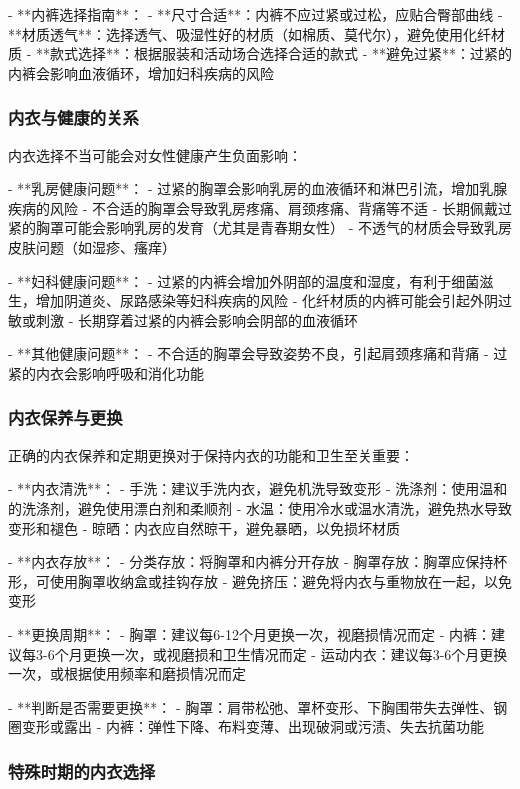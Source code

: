 \begin{enumerate}
- **内裤选择指南**：
  - **尺寸合适**：内裤不应过紧或过松，应贴合臀部曲线
  - **材质透气**：选择透气、吸湿性好的材质（如棉质、莫代尔），避免使用化纤材质
  - **款式选择**：根据服装和活动场合选择合适的款式
  - **避免过紧**：过紧的内裤会影响血液循环，增加妇科疾病的风险

\subsubsection{内衣与健康的关系}

内衣选择不当可能会对女性健康产生负面影响：

- **乳房健康问题**：
  - 过紧的胸罩会影响乳房的血液循环和淋巴引流，增加乳腺疾病的风险
  - 不合适的胸罩会导致乳房疼痛、肩颈疼痛、背痛等不适
  - 长期佩戴过紧的胸罩可能会影响乳房的发育（尤其是青春期女性）
  - 不透气的材质会导致乳房皮肤问题（如湿疹、瘙痒）

- **妇科健康问题**：
  - 过紧的内裤会增加外阴部的温度和湿度，有利于细菌滋生，增加阴道炎、尿路感染等妇科疾病的风险
  - 化纤材质的内裤可能会引起外阴过敏或刺激
  - 长期穿着过紧的内裤会影响会阴部的血液循环

- **其他健康问题**：
  - 不合适的胸罩会导致姿势不良，引起肩颈疼痛和背痛
  - 过紧的内衣会影响呼吸和消化功能

\subsubsection{内衣保养与更换}

正确的内衣保养和定期更换对于保持内衣的功能和卫生至关重要：

- **内衣清洗**：
  - 手洗：建议手洗内衣，避免机洗导致变形
  - 洗涤剂：使用温和的洗涤剂，避免使用漂白剂和柔顺剂
  - 水温：使用冷水或温水清洗，避免热水导致变形和褪色
  - 晾晒：内衣应自然晾干，避免暴晒，以免损坏材质

- **内衣存放**：
  - 分类存放：将胸罩和内裤分开存放
  - 胸罩存放：胸罩应保持杯形，可使用胸罩收纳盒或挂钩存放
  - 避免挤压：避免将内衣与重物放在一起，以免变形

- **更换周期**：
  - 胸罩：建议每6-12个月更换一次，视磨损情况而定
  - 内裤：建议每3-6个月更换一次，或视磨损和卫生情况而定
  - 运动内衣：建议每3-6个月更换一次，或根据使用频率和磨损情况而定

- **判断是否需要更换**：
  - 胸罩：肩带松弛、罩杯变形、下胸围带失去弹性、钢圈变形或露出
  - 内裤：弹性下降、布料变薄、出现破洞或污渍、失去抗菌功能

\subsubsection{特殊时期的内衣选择}


\end{enumerate}
